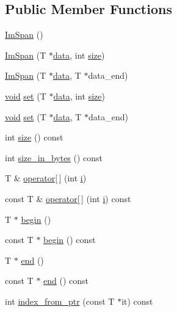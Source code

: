 \subsection*{Public Member Functions}
\begin{DoxyCompactItemize}
\item 
\hyperlink{structImSpan_a7321bafbe082a57c06851713da41c42d}{Im\+Span} ()
\item 
\hyperlink{structImSpan_a504d7469748d2ebf782f3993d8f35ad2}{Im\+Span} (T $\ast$\hyperlink{imgui__impl__opengl3__loader_8h_abd87654504355b4c1bb002dcb1d4d16a}{data}, int \hyperlink{imgui__impl__opengl3__loader_8h_a3d1e3edfcf61ca2d831883e1afbad89e}{size})
\item 
\hyperlink{structImSpan_abc89fdbfad2b87dd044a197983c4eddb}{Im\+Span} (T $\ast$\hyperlink{imgui__impl__opengl3__loader_8h_abd87654504355b4c1bb002dcb1d4d16a}{data}, T $\ast$data\+\_\+end)
\item 
\hyperlink{imgui__impl__opengl3__loader_8h_ac668e7cffd9e2e9cfee428b9b2f34fa7}{void} \hyperlink{structImSpan_a0c07dbc18bebd7d02ca1fb866861506a}{set} (T $\ast$\hyperlink{imgui__impl__opengl3__loader_8h_abd87654504355b4c1bb002dcb1d4d16a}{data}, int \hyperlink{imgui__impl__opengl3__loader_8h_a3d1e3edfcf61ca2d831883e1afbad89e}{size})
\item 
\hyperlink{imgui__impl__opengl3__loader_8h_ac668e7cffd9e2e9cfee428b9b2f34fa7}{void} \hyperlink{structImSpan_aa663983a692baf82e44687cc9a373964}{set} (T $\ast$\hyperlink{imgui__impl__opengl3__loader_8h_abd87654504355b4c1bb002dcb1d4d16a}{data}, T $\ast$data\+\_\+end)
\item 
int \hyperlink{structImSpan_a88270b885861b27640003f6a8a3effa0}{size} () const
\item 
int \hyperlink{structImSpan_a23a632e44927fde363df6191531591f2}{size\+\_\+in\+\_\+bytes} () const
\item 
T \& \hyperlink{structImSpan_aaed286a9cac1e66da7339a1f1f3365ee}{operator\mbox{[}$\,$\mbox{]}} (int \hyperlink{game__play__state_8cpp_acb559820d9ca11295b4500f179ef6392}{i})
\item 
const T \& \hyperlink{structImSpan_a84f94165e0b21ed2b9310bead0668a07}{operator\mbox{[}$\,$\mbox{]}} (int \hyperlink{game__play__state_8cpp_acb559820d9ca11295b4500f179ef6392}{i}) const
\item 
T $\ast$ \hyperlink{structImSpan_a4f3db65183b094582006ba5439224358}{begin} ()
\item 
const T $\ast$ \hyperlink{structImSpan_abb2e6461d94d0d73b7a6c458b2c1957e}{begin} () const
\item 
T $\ast$ \hyperlink{structImSpan_a1cb3c66ef0d5b8b5cde4651df83ff0fb}{end} ()
\item 
const T $\ast$ \hyperlink{structImSpan_acae18ccf3579235d6e0bb4dcd2c61dba}{end} () const
\item 
int \hyperlink{structImSpan_a7e80a5146acbfac4bb952f80daf3c305}{index\+\_\+from\+\_\+ptr} (const T $\ast$it) const
\end{DoxyCompactItemize}

